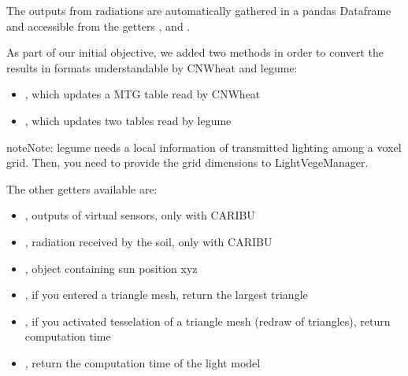 \documentclass[letterpaper,10pt,english]{sphinxmanual}
\begin{document}
\sphinxAtStartPar
The outputs from radiations are automatically gathered in a pandas Dataframe and accessible from the getters ,  and .

\sphinxAtStartPar
As part of our initial objective, we added two methods in order to convert the results in formats understandable by CN\sphinxhyphen{}Wheat and l\sphinxhyphen{}egume:
\begin{itemize}
\item {} 
\sphinxAtStartPar
{}, which updates a MTG table read by CN\sphinxhyphen{}Wheat

\item {} 
\sphinxAtStartPar
{}, which updates two tables read by l\sphinxhyphen{}egume

\end{itemize}

\begin{sphinxadmonition}{note}{Note:}
\sphinxAtStartPar
l\sphinxhyphen{}egume needs a local information of transmitted lighting among a voxel grid. Then, you need to provide the grid dimensions to LightVegeManager.
\end{sphinxadmonition}

\sphinxAtStartPar
The other getters available are:
\begin{itemize}
\item {} 
\sphinxAtStartPar
{}, outputs of virtual sensors, only with CARIBU

\item {} 
\sphinxAtStartPar
{}, radiation received by the soil, only with CARIBU

\item {} 
\sphinxAtStartPar
{\hyperref[\detokenize{reference:module-sun}]{}}, object containing sun position xyz

\item {} 
\sphinxAtStartPar
{}, if you entered a triangle mesh, return the largest triangle

\item {} 
\sphinxAtStartPar
{}, if you activated tesselation of a triangle mesh (redraw of triangles), return computation time

\item {} 
\sphinxAtStartPar
{}, return the computation time of the light model

\end{itemize}
\end{document}
